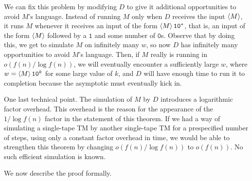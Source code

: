 \documentclass[11pt,twoside=off,numbers=noenddot]{scrbook}
\begin{document}
\begin{proofidea}
  We can fix this problem by modifying $D$ to give it additional opportunities to avoid $M$'s language. Instead of running $M$ only when $D$ receives the input $\left< M \right>$, it runs $M$ whenever it receives an input of the form $\left< M \right>\texttt{1}\texttt{0}^\ast$, that is, an input of the form $\left< M \right>$ followed by a $\texttt{1}$ and some number of $\texttt{0}$s. Observe that by doing this, we get to simulate $M$ on infinitely many $w$, so now $D$ has infinitely many opportunities to avoid $M$'s language. Then, if $M$ really is running in $o(f(n) / \log f(n))$, we will eventually encounter a sufficiently large $w$, where $w = \left< M \right>\texttt{1}\texttt{0}^k$ for some large value of $k$, and $D$ will have enough time to run it to completion because the asymptotic must eventually kick in.

  One last technical point. The simulation of $M$ by $D$ introduces a logarithmic factor overhead. This overhead is the reason for the appearance of the $1 / \log f(n)$ factor in the statement of this theorem. If we had a way of simulating a single-tape TM by another single-tape TM for a prespecified number of steps, using only a constant factor overhead in time, we would be able to strengthen this theorem by changing $o(f(n) / \log f(n))$ to $o(f(n))$. No such efficient simulation is known.
\end{proofidea}

We now describe the proof formally.
\end{document}
